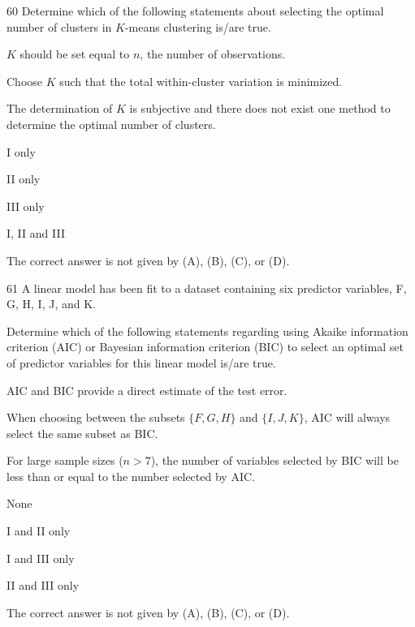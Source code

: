 \begin{question}{60}
Determine which of the following statements about selecting the optimal number of clusters in $K$-means clustering is/are true.

\begin{statements}
\item $K$ should be set equal to $n$, the number of observations.
\item Choose $K$ such that the total within-cluster variation is minimized.
\item The determination of $K$ is subjective and there does not exist one method to determine the optimal number of clusters.
\end{statements}

\begin{choices}
\item I only
\item II only
\item III only
\item I, II and III
\item The correct answer is not given by (A), (B), (C), or (D).
\end{choices}
\end{question}

\begin{question}{61}
A linear model has been fit to a dataset containing six predictor variables, F, G, H, I, J, and K.

Determine which of the following statements regarding using Akaike information criterion (AIC) or Bayesian information criterion (BIC) to select an optimal set of predictor variables for this linear model is/are true.

\begin{statements}
\item AIC and BIC provide a direct estimate of the test error.
\item When choosing between the subsets $\{F, G, H\}$ and $\{I, J, K\}$, AIC will always select the same subset as BIC.
\item For large sample sizes ($n > 7$), the number of variables selected by BIC will be less than or equal to the number selected by AIC.
\end{statements}

\begin{choices}
\item None
\item I and II only
\item I and III only
\item II and III only
\item The correct answer is not given by (A), (B), (C), or (D).
\end{choices}
\end{question}

